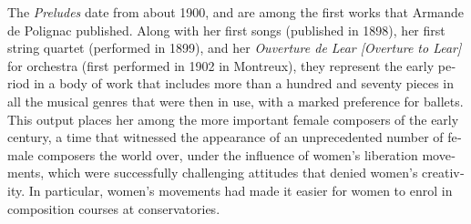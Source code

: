 \documentclass[a4paper, 12pt]{book}
\newcommand{\bigdot}[0]{{\Large \textbullet}}
\newcommand{\centerbigdot}[0]{\begin{center}\bigdot\end{center}}
\begin{document}
\vspace{\baselineskip}

\centerbigdot

\begin{otherlanguage}{english}

The \emph{Preludes} date from about 1900, and are among the first
works that Armande de Polignac published. Along with her first songs
(published in 1898), her first string quartet (performed in 1899), and
her \emph{Ouverture de Lear [Overture to Lear]} for orchestra (first
performed in 1902 in Montreux), they represent the early period in a
body of work that includes more than a hundred and seventy pieces in all
the musical genres that were then in use, with a marked preference for
ballets. This output places her among the more important female
composers of the early  century, a time that witnessed the
appearance of an unprecedented number of female composers the world
over, under the influence of women's liberation movements, which were
successfully challenging attitudes that denied women's creativity. In
particular, women's movements had made it easier for women to enrol in
composition courses at conservatories.


\end{otherlanguage}
\end{document}
